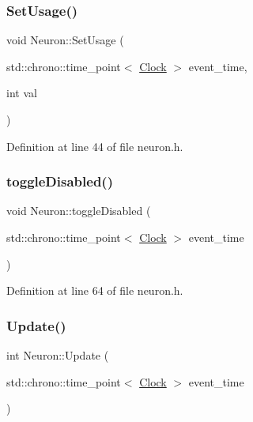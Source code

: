 \subsubsection{\texorpdfstring{Set\+Usage()}{SetUsage()}}
{\footnotesize\ttfamily void Neuron\+::\+Set\+Usage (\begin{DoxyParamCaption}\item[{std\+::chrono\+::time\+\_\+point$<$ \hyperlink{universe_8h_a0ef8d951d1ca5ab3cfaf7ab4c7a6fd80}{Clock} $>$}]{event\+\_\+time,  }\item[{int}]{val }\end{DoxyParamCaption})\hspace{0.3cm}{\ttfamily [inline]}}



Definition at line 44 of file neuron.\+h.

\mbox{\label{class_neuron_a32fe82aa21f8a68392d696eea3a34c99}} 
\subsubsection{\texorpdfstring{toggle\+Disabled()}{toggleDisabled()}}
{\footnotesize\ttfamily void Neuron\+::toggle\+Disabled (\begin{DoxyParamCaption}\item[{std\+::chrono\+::time\+\_\+point$<$ \hyperlink{universe_8h_a0ef8d951d1ca5ab3cfaf7ab4c7a6fd80}{Clock} $>$}]{event\+\_\+time }\end{DoxyParamCaption})\hspace{0.3cm}{\ttfamily [inline]}}



Definition at line 64 of file neuron.\+h.

\mbox{\label{class_neuron_a4d1dc3a9f30196fe2b09dfbfc0a567bb}} 
\subsubsection{\texorpdfstring{Update()}{Update()}}
{\footnotesize\ttfamily int Neuron\+::\+Update (\begin{DoxyParamCaption}\item[{std\+::chrono\+::time\+\_\+point$<$ \hyperlink{universe_8h_a0ef8d951d1ca5ab3cfaf7ab4c7a6fd80}{Clock} $>$}]{event\+\_\+time }\end{DoxyParamCaption})}



